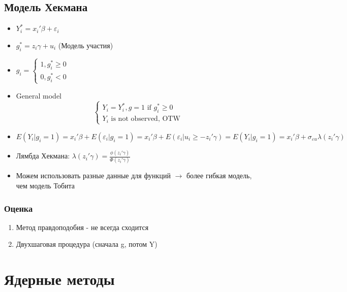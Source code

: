 \documentclass[a4paper, 12pt]{article}
\begin{document}
\subsection{Модель Хекмана}

\begin{itemize}
    \item $Y^{*}_{i} = x_{i}'\beta + \varepsilon_{i}$
    \item $g_{i}^{*} = z_{i}\gamma + u_{i}$ (Модель участия)
    \item $g_{i} = \begin{cases}1, g_{i}^{*} \geq 0 \\ 0, g_{i}^{*} < 0\end{cases}$
    \item General model
    \[\begin{cases}
        Y_{i} = Y_{i}^{*}, g = 1 \textrm{ if } g_{i}^{*} \geq 0 \\
        Y_{i} \textrm{ is not observed, OTW}
    \end{cases}\]
    \item $E(Y_{i}|g_{i} = 1) = x_{i}'\beta + E(\varepsilon_{i}|g_{i} = 1) = x_{i}'\beta + E(\varepsilon_{i}|u_{i} \geq -z_{i}'\gamma) = E(Y_{i}|g_{i} = 1) = x_{i}'\beta + \sigma_{\varepsilon u}\lambda(z_{i}'\gamma)$
    \item Лямбда Хекмана: $\lambda(z_{i}'\gamma) = \frac{\phi(z_{i}'\gamma)}{\Phi(z_{i}'\gamma)}$
    \item Можем использовать разные данные для функций $\rightarrow$ более гибкая модель, чем модель Тобита
\end{itemize}

\subsubsection{Оценка}

\begin{enumerate}
    \item Метод правдоподобия - не всегда сходится
    \item Двухшаговая процедура (сначала g, потом Y)
\end{enumerate}

\section{Ядерные методы}
\end{document}
